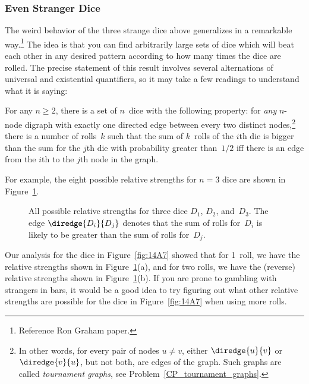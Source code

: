 \subsubsection{Even Stranger Dice}

The weird behavior of the three strange dice above generalizes in a
remarkable way.\footnote{Reference Ron Graham paper.}  The idea is
that you can find arbitrarily large sets of dice which will beat each
other in any desired pattern according to how many times the dice are
rolled.  The precise statement of this result involves several
alternations of universal and existential quantifiers, so it may take
a few readings to understand what it is saying:

\iffalse Now that we know that strange things can happen with strange
dice, it is natural, at least for mathematicians, to ask how strange
things can get.  It turns out that things can get very strange.  In
fact, mathematicians recently made the following discovery:\fi

\begin{theorem}\label{thm:14F2}
For any $n \ge 2$, there is a set of $n$~dice with the following
property: for \emph{any} $n$-node digraph with exactly one directed
edge between every two distinct nodes,\footnote{In other words, for
  every pair of nodes $u \neq v$, either $\diredge{u}{v}$ or
  $\diredge{v}{u}$, but not both, are edges of the graph.  Such graphs
  are called \emph{tournament graphs}, see
  Problem~\ref{CP_tournament_graphs}.} there is a number of rolls~$k$
such that the sum of $k$~rolls of the $i$th die is bigger than the sum
for the $j$th die with probability greater than~$1/2$ iff there is an
edge from the $i$th to the $j$th node in the graph.
\end{theorem}

For example, the eight possible relative strengths for $n =
3$ dice are shown in Figure~\ref{fig:14A13}.  

\begin{figure}


\caption{All possible relative strengths for three dice $D_1$, $D_2$,
  and~$D_3$.  The edge $\diredge{D_i}{D_j}$ denotes that the sum of
  rolls for~$D_i$ is likely to be greater than the sum of rolls
  for~$D_j$.}

\label{fig:14A13}

\end{figure}

Our analysis for the dice in Figure~\ref{fig:14A7} showed that for
1~roll, we have the relative strengths shown in
Figure~\ref{fig:14A13}(a), and for two rolls, we have the (reverse)
relative strengths shown in Figure~\ref{fig:14A13}(b).  If you are
prone to gambling with strangers in bars, it would be a good idea to
try figuring out what other relative strengths are possible for the
dice in Figure~\ref{fig:14A7} when using more rolls.

